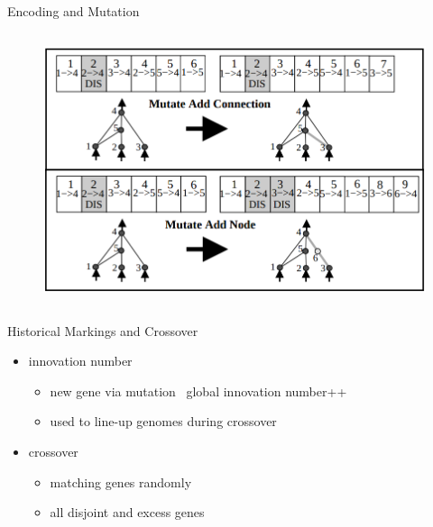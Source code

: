 \documentclass{beamer}
\begin{document}
\begin{frame}{Encoding and Mutation}
\begin{columns}
\begin{column}{0.5\textwidth}
\begin{figure}[c]
            \end{figure}
            \begin{figure}[c]
                \includegraphics[width = \textwidth]{img/mutation.png}
            \end{figure}
        \end{column}
    \end{columns}
\end{frame}
\begin{frame}{Historical Markings and Crossover}
    \begin{itemize}
        \item innovation number
              \begin{itemize}
                  \item new gene via mutation \textrightarrow\ global innovation number++
                  \item used to line-up genomes during crossover
              \end{itemize}
        \item crossover
              \begin{itemize}
                  \item matching genes randomly
                  \item all disjoint and excess genes
              \end{itemize}
    \end{itemize}
\end{frame}
\end{document}
